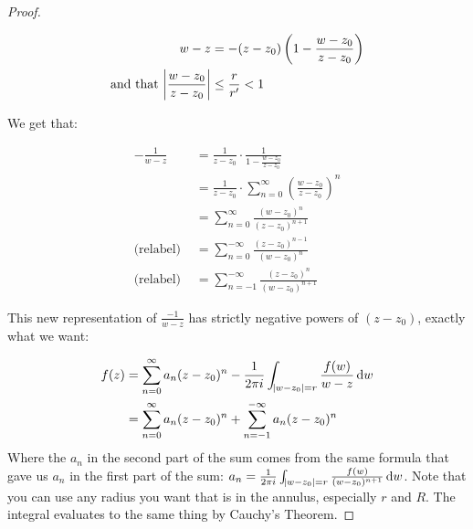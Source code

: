 \begin{proof}
\begin{center}
\end{center}




\begin{align*}
    w-z &= - (z-z_0) \left(   1-  \frac{w-z_0}{z-z_0} \right)\\
\text{and that } \abs{\frac{w-z_0}{z-z_0}} &\leq \frac{r}{r'} < 1
\end{align*}

We get that:

\begin{align*}
    -\frac{1}{w-z} &= \frac{1}{z-z_0} \cdot \frac{1}{1-\frac{w-z_0}{z-z_0}}\\ &= \frac{1}{z-z_0} \cdot \sum_{n=0}^\infty \left( \frac{w-z_0}{z-z_0} \right)^n\\
    &= \sum_{n=0}^\infty \frac{(w-z_0)^n}{(z-z_0)^{n+1}}\\
    \text{(relabel) } &= \sum_{n=0}^{-\infty} \frac{(z-z_0)^{n-1}}{(w-z_0)^n}\\
    \text{(relabel) } &= \sum_{n=-1}^{-\infty} \frac{(z-z_0)^{n}}{(w-z_0)^{n+1}}
\end{align*}

This new representation of $\frac{-1}{w-z}$ has strictly negative powers of $(z-z_0)$, exactly what we want:

\begin{align*}
    f(z) &= \sum_{n=0}^\infty a_n (z-z_0)^n - \frac{1}{2 \pi i} \int_{\abs{w- z_0} = r} \frac{f(w)}{w-z} \dif w\\
    &= \sum_{n=0}^\infty a_n (z-z_0)^n + \sum_{n=-1}^{-\infty} a_n (z-z_0)^n\\
\end{align*}
Where the $a_n$ in the second part of the sum comes from the same formula that gave us $a_n$ in the first part of the sum: $a_n = \frac{1}{2 \pi i} \int_{\abs{w- z_0} = r} \frac{f(w)}{(w-z_0)^{n+1}} \dif w$. Note that you can use any radius you want that is in the annulus, especially $r$ and $R$. The integral evaluates to the same thing by Cauchy's Theorem.
\end{proof}


